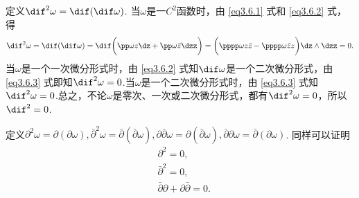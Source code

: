 定义$\dif ^2\omega=\dif (\dif \omega)$. 当$\omega$是一$C^2$函数时，由 \eqref{eq3.6.1} 式和 \eqref{eq3.6.2} 式，得
\begin{equation}\label{eq3.6.4}
\dif ^2\omega=\dif (\dif \omega)=\dif \bigg(
\pp\omega z\dz+\pp\omega{\bar z}\dzz\bigg)=\bigg(\pppp\omega z{\bar z}-
\pppp\omega{\bar z}z\bigg)\dz\wedge\dzz=0.
\end{equation}
当$\omega$是一个一次微分形式时，由 \eqref{eq3.6.2} 式知$\dif \omega$是一个二次微分形式，由 \eqref{eq3.6.3} 式即知$\dif ^2\omega=0$.当$\omega$是一个二次微分形式时，由 \eqref{eq3.6.3} 式知$\dif ^2\omega=0$.总之，不论$\omega$是零次、一次或二次微分形式，都有$\dif ^2\omega=0$，所以$\dif ^2=0$.

定义$\partial^2\omega=\partial(\partial\omega),\bar\partial^2\omega=
\bar\partial(\bar\partial\omega),\partial\bar\partial\omega=\partial(\bar\partial\omega),
\bar\partial\partial\omega=\bar\partial(\partial\omega)$. 同样可以证明
\begin{equation}\label{eq3.6.5}
\begin{aligned}
&\partial^2=0,\\
&\bar\partial^2=0,\\
&\bar\partial\partial+\partial\bar\partial=0.
\end{aligned}
\end{equation}

